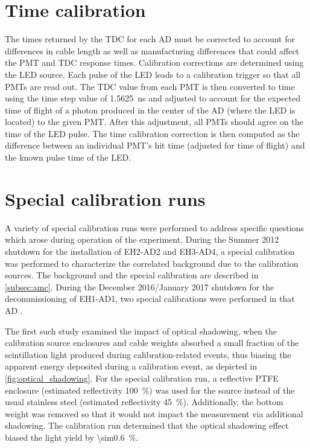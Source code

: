 \section{Time calibration}
\label{sec:time_calib}

The times returned by the TDC for each AD must be corrected
to account for differences in cable length as well as
manufacturing differences that could affect the PMT and TDC response times.
Calibration corrections are determined using the LED source.
Each pulse of the LED leads to a calibration trigger so that all PMTs are read out.
The TDC value from each PMT is then converted to time using the
time step value of \SI{1.5625}{\ns} and adjusted
to account for the expected time of flight
of a photon produced in the center of the AD (where the LED is located)
to the given PMT.
After this adjustment, all PMTs should agree on the time of the LED pulse.
The time calibration correction is then computed
as the difference between an individual PMT's hit time
(adjusted for time of flight)
and the known pulse time of the LED.

\section{Special calibration runs}
\label{sec:special_calib}

A variety of special calibration runs were performed
to address specific questions which arose during operation of the experiment.
During the Summer 2012 shutdown for the installation of EH2-AD2 and EH3-AD4,
a special calibration was performed to characterize the correlated background
due to the \amc{} calibration sources.
The \amc{} background and the special calibration are described in \cref{subsec:amc}.
During the December 2016/January 2017 shutdown for the decommissioning of EH1-AD1,
two special calibrations were performed in that AD \cite{calib_proposal2017}.

The first such study examined the impact of optical shadowing,
when the calibration source enclosures and cable weights
absorbed a small fraction of the scintillation light
produced during calibration-related events,
thus biasing the apparent energy deposited during a calibration event,
as depicted in \cref{fig:optical_shadowing}.
For the special calibration run,
a reflective PTFE enclosure (estimated reflectivity \SI{100}{\percent})
was used for the  source
instead of the usual stainless steel (estimated reflectivity \SI{45}{\percent}).
Additionally, the bottom weight was removed
so that it would not impact the measurement via additional shadowing.
The calibration run determined that
the optical shadowing effect biased the light yield by \SI{\sim0.6}{\percent}.

